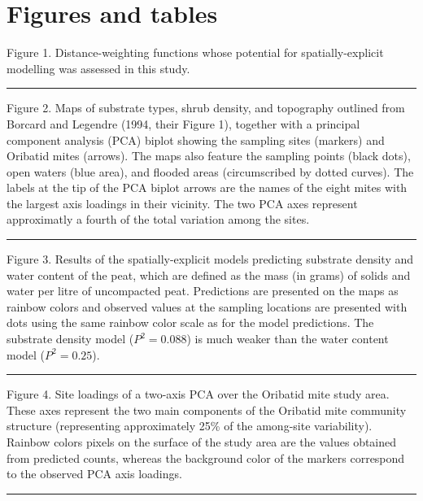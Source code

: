 \documentclass[
]{article}
\begin{document}
\section{Figures and tables}\label{figures-and-tables}

Figure 1. Distance-weighting functions whose potential for
spatially-explicit modelling was assessed in this study.

\begin{center}\rule{0.5\linewidth}{0.5pt}\end{center}

Figure 2. Maps of substrate types, shrub density, and topography
outlined from Borcard and Legendre (1994, their Figure 1), together with
a principal component analysis (PCA) biplot showing the sampling sites
(markers) and Oribatid mites (arrows). The maps also feature the
sampling points (black dots), open waters (blue area), and flooded areas
(circumscribed by dotted curves). The labels at the tip of the PCA
biplot arrows are the names of the eight mites with the largest axis
loadings in their vicinity. The two PCA axes represent approximatly a
fourth of the total variation among the sites.

\begin{center}\rule{0.5\linewidth}{0.5pt}\end{center}

Figure 3. Results of the spatially-explicit models predicting substrate
density and water content of the peat, which are defined as the mass (in
grams) of solids and water per litre of uncompacted peat. Predictions
are presented on the maps as rainbow colors and observed values at the
sampling locations are presented with dots using the same rainbow color
scale as for the model predictions. The substrate density model
(\(P^2=0.088\)) is much weaker than the water content model
(\(P^2=0.25\)).

\begin{center}\rule{0.5\linewidth}{0.5pt}\end{center}

Figure 4. Site loadings of a two-axis PCA over the Oribatid mite study
area. These axes represent the two main components of the Oribatid mite
community structure (representing approximately 25\% of the among-site
variability). Rainbow colors pixels on the surface of the study area are
the values obtained from predicted counts, whereas the background color
of the markers correspond to the observed PCA axis loadings.

\begin{center}\rule{0.5\linewidth}{0.5pt}\end{center}
\end{document}
